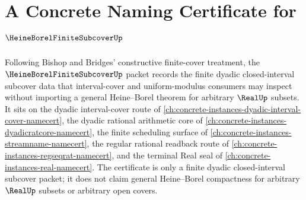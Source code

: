 \chapter{A Concrete Naming Certificate for $\HeineBorelFiniteSubcoverUp$}
\label{ch:concrete-instances-heine-borel-finite-subcover-namecert}

Following Bishop and Bridges' constructive finite-cover treatment, the $\HeineBorelFiniteSubcoverUp$ packet records the finite dyadic closed-interval subcover data that interval-cover and uniform-modulus consumers may inspect without importing a general Heine--Borel theorem for arbitrary $\RealUp$ subsets. It sits on the dyadic interval-cover route of \autoref{ch:concrete-instances-dyadic-interval-cover-namecert}, the dyadic rational arithmetic core of \autoref{ch:concrete-instances-dyadicratcore-namecert}, the finite scheduling surface of \autoref{ch:concrete-instances-streamname-namecert}, the regular rational readback route of \autoref{ch:concrete-instances-regseqrat-namecert}, and the terminal Real seal of \autoref{ch:concrete-instances-real-namecert}. The certificate is only a finite dyadic closed-interval subcover packet; it does not claim general Heine--Borel compactness for arbitrary $\RealUp$ subsets or arbitrary open covers.

